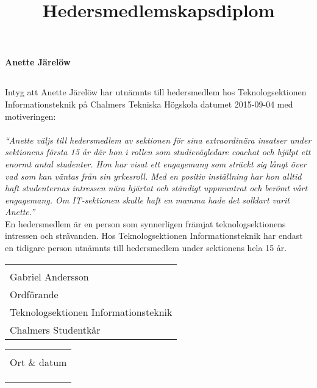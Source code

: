\documentclass[11pt, noincludeaddress, nopagination]{classes/cthit}
\makeatletter
\newcommand{\sign}[4]{%
  \begin{tabular}[t]{@{}l@{}}
  \makebox[6.5cm]{\dotfill}\\
  \strut#1\strut \\
  \strut#2\strut \\
  \strut#3\strut \\
  \strut#4\strut \\
  \end{tabular}%
}
\makeatother
\begin{document}
\title{Hedersmedlemskapsdiplom}

\makeheadfoot%

\makesimpletitle
\begin{center}
\textbf{\Huge{Anette Järelöw}}
\end{center}
\vspace{1cm}
\subsection*{}
Intyg att Anette Järelöw har utnämnts till hedersmedlem hos Teknologsektionen Informationsteknik på Chalmers Tekniska Högskola datumet 2015-09-04 med motiveringen: 
\\
\\
\textit{
``Anette väljs till hedersmedlem av sektionen för sina extraordinära insatser under sektionens första 15 år där hon i rollen som studievägledare coachat och hjälpt ett enormt antal studenter. Hon har visat ett engagemang som sträckt sig långt över vad som kan väntas från sin yrkesroll. Med en positiv inställning har hon alltid haft studenternas intressen nära hjärtat och ständigt uppmuntrat och berömt vårt engagemang. Om IT-sektionen skulle haft en mamma hade det solklart varit Anette.''
}
\\

En hedersmedlem är en person som synnerligen främjat teknologsektionens intressen och strävanden. Hos Teknologsektionen Informationsteknik har endast en tidigare person utnämnts till hedersmedlem under sektionens hela 15 år.

\vspace{4cm} 

\noindent
  \begin{minipage}[t]{0.5\linewidth}
    \raggedright
    \sign{Gabriel Andersson}{Ordförande}{Teknologsektionen Informationsteknik}{Chalmers Studentkår}
  \end{minipage}%
  \hfill
  \begin{minipage}[t]{0.5\linewidth}
  \sign{Ort \& datum}{}{}{}
  \end{minipage}
\end{document}
